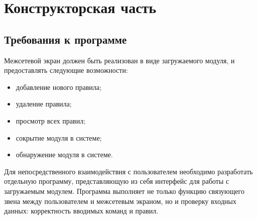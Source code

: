\section{Конструкторская часть}

\subsection{Требования к программе}
Межсетевой экран должен быть реализован в виде загружаемого модуля, и предоставлять следующие возможности:
\begin{itemize}
	\item добавление нового правила;

	\item удаление правила;
	
	\item просмотр всех правил;
	
	\item сокрытие модуля в системе;
	
	\item обнаружение модуля в системе. \\
\end{itemize}

Для непосредственного взаимодействия с пользователем необходимо разработать отдельную программу, представляющую из себя интерфейс для работы с загружаемым модулем. Программа выполняет не только функцию связующего звена между пользователем и межсетевым экраном, но и проверку входных данных: корректность вводимых команд и правил. \\

